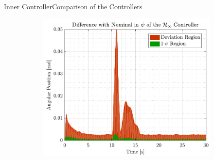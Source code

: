 \begin{frame}{Inner Controller}{Comparison of the Controllers}
\begin{figure}[H]
\begin{minipage}{0.45\linewidth}
\begin{figure}[H]
        \includegraphics[width=1\linewidth]{figures/yaw_mc_rob_error}
      \end{figure}                
    \end{minipage}\hfill \\
  \end{figure}
\end{frame}

